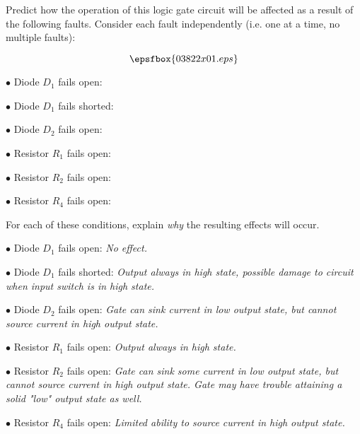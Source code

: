 

Predict how the operation of this logic gate circuit will be affected as a result of the following faults.  Consider each fault independently (i.e. one at a time, no multiple faults):

$$\epsfbox{03822x01.eps}$$

\medskip
\item{$\bullet$} Diode $D_1$ fails open:
\vskip 5pt
\item{$\bullet$} Diode $D_1$ fails shorted:
\vskip 5pt
\item{$\bullet$} Diode $D_2$ fails open:
\vskip 5pt
\item{$\bullet$} Resistor $R_1$ fails open:
\vskip 5pt
\item{$\bullet$} Resistor $R_2$ fails open:
\vskip 5pt
\item{$\bullet$} Resistor $R_4$ fails open:
\medskip

For each of these conditions, explain {\it why} the resulting effects will occur.







\medskip
\item{$\bullet$} Diode $D_1$ fails open: {\it No effect.}
\vskip 5pt
\item{$\bullet$} Diode $D_1$ fails shorted: {\it Output always in high state, possible damage to circuit when input switch is in high state.}
\vskip 5pt
\item{$\bullet$} Diode $D_2$ fails open: {\it Gate can sink current in low output state, but cannot source current in high output state.}
\vskip 5pt
\item{$\bullet$} Resistor $R_1$ fails open: {\it Output always in high state.}
\vskip 5pt
\item{$\bullet$} Resistor $R_2$ fails open: {\it Gate can sink some current in low output state, but cannot source current in high output state.  Gate may have trouble attaining a solid "low" output state as well.}
\vskip 5pt
\item{$\bullet$} Resistor $R_4$ fails open: {\it Limited ability to source current in high output state.}
\medskip

